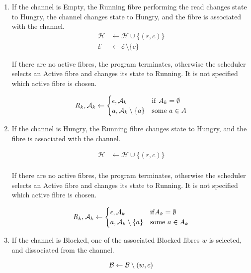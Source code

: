 \documentclass{article}
\begin{document}
\begin{enumerate}
\item If the channel is Empty, the Running fibre performing the read
changes state to Hungry, the channel changes state to Hungry,
and the fibre is associated with the channel.
\begin{align}
{\mathcal H}&\leftarrow {\mathcal H} \cup \{(r,c)\}\\
{\mathcal E} &\leftarrow {\mathcal E} \setminus \{c\}
\end{align}

If there are no active fibres, the program terminates,
otherwise the scheduler selects an Active fibre and
changes its state to Running.  It is not specified which active 
fibre is chosen.

\begin{equation}
R_k,{\mathcal A_k} \leftarrow
\begin{cases}
\epsilon,{\mathcal A_k}& {\rm if\ } A_k=\emptyset \\
a,{\mathcal A_k} \setminus \{a\} & {\rm some\ } a\in A
\end{cases}
\end{equation}


\item If the channel is Hungry, the Running fibre changes state
to Hungry, and the fibre is associated with the channel.

\begin{align}
{\mathcal H}&\leftarrow {\mathcal H} \cup \{(r,c)\}\\
\end{align}

If there are no active fibres, the program terminates,
otherwise the scheduler selects an Active fibre and
changes its state to Running.  It is not specified which active 
fibre is chosen.

\begin{equation}
R_k,{\mathcal A_k} \leftarrow
\begin{cases}
\epsilon,{\mathcal A_k}& {\rm if} A_k=\emptyset \\
a,{\mathcal A_k} \setminus \{a\} & {\rm some\ } a\in A_k
\end{cases}
\end{equation}


\item If the channel is Blocked, one of the associated Blocked fibres $w$
is selected, and dissociated from the channel. 

\begin{equation}
{\mathcal B} \leftarrow {\mathcal B}\setminus (w,c)\\ 
\end{equation}


\end{enumerate}
\end{document}
